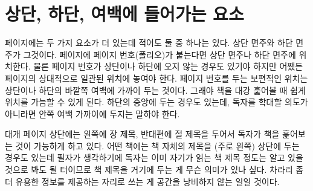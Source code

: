 \section{상단, 하단, 여백에 들어가는 요소}
\label{sec:head-foot-marg}

페이지에는 두 가지 요소가 더 있는데 적어도 둘 중 하나는 있다. 상단 면주와
하단 면주가 그것이다. 페이지에 페이지 번호(폴리오)가 붙는다면 상단 면주나
하단 면주에 위치한다. 물론 페이지 번호가 상단이나 하단에 오지 않는 경우도
있기야 하지만 어쨌든 페이지의 상대적으로 일관된 위치에 놓여야 한다.
페이지 번호를 두는 보편적인 위치는 상단이나 하단의 바깥쪽 여백에 가까이 두는 것이다. 그래야 책을 대강 훑어볼 때 쉽게 위치를 가늠할 수 있게 된다.
하단의 중앙에 두는 경우도 있는데, 독자를 학대할 의도가 아니라면 
안쪽 여백 가까이에 두지는 말하야 한다.

대개 페이지 상단에는 왼쪽에 장 제목, 반대편에 절 제목을 두어서 독자가
책을 훑어보는 것이 가능하게 하고 있다. 어떤 책에는 책 자체의 제목을
(주로 왼쪽) 상단에 두는 경우도 있는데 필자가 생각하기에 독자는 이미
자기가 읽는 책 제목 정도는 알고 있을 것으로 봐도 될 터이므로 책 제목을 거기에 두는 게
무슨 의미가 있나 싶다. 차라리 좀더 유용한 정보를 제공하는 자리로 쓰는 게
공간을 낭비하지 않는 일일 것이다.


